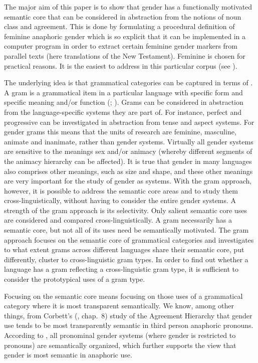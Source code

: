 \documentclass[output=collectionpaper]{langsci/langscibook}
\begin{document}
The major aim of this paper is to show that gender has a functionally motivated semantic core that can be considered in abstraction from the notions of noun class and agreement. This is done by formulating a procedural definition of feminine anaphoric gender which is so explicit that it can be implemented in a computer program in order to extract certain feminine gender markers from parallel texts (here translations of the New Testament). Feminine is chosen for practical reasons. It is the easiest to address in this particular corpus (see ).

\newpage 
The underlying idea is that grammatical categories can be captured in terms of . A gram is a grammatical item in a particular language with specific form and specific meaning and/or function (\citealt{Bybee1989}; \citealt{Dahl2016}). Grams can be considered in abstraction from the language-specific systems they are part of. For instance, perfect and progressive can be investigated in abstraction from tense and aspect systems. For gender grams this means that the units of research are feminine, masculine, animate and inanimate, rather than gender systems. Virtually all gender systems are sensitive to the meanings sex and/or animacy (whereby different segments of the animacy hierarchy can be affected). It is true that gender in many languages also comprises other meanings, such as size and shape, and these other meanings are very important for the study of gender as systems. With the gram approach, however, it is possible to address the semantic core areas and to study them cross-linguistically, without having to consider the entire gender systems. A strength of the gram approach is its selectivity. Only salient semantic core uses are considered and compared cross-linguistically. A gram necessarily has a semantic core, but not all of its uses need be semantically motivated. The gram approach focuses on the semantic core of grammatical categories and investigates to what extent grams across different languages share their semantic core, put differently, cluster to cross-linguistic gram types. In order to find out whether a language has a gram reflecting a cross-linguistic gram type, it is sufficient to consider the prototypical uses of a gram type.

Focusing on the semantic core means focusing on those uses of a grammatical category where it is most transparent semantically. We know, among other things, from Corbett’s (\citeyear{Corbett1991}, chap.~8) study of the Agreement Hierarchy that gender use tends to be most transparently semantic in third person anaphoric pronouns. According to \citet{Audring2009a}, all pronominal gender systems (where gender is restricted to pronouns) are semantically organized, which further supports the view that gender is most semantic in anaphoric use.
\end{document}
